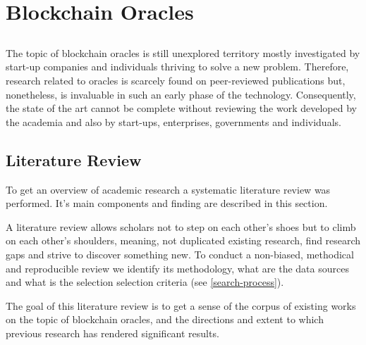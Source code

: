 \chapter{Blockchain Oracles} \label{chap:sota}

\section*{}



The topic of blockchain oracles is still unexplored territory mostly investigated by start-up companies and individuals thriving to solve a new problem. Therefore, research related to oracles is scarcely found on peer-reviewed publications but, nonetheless, is invaluable in such an early phase of the technology. Consequently, the state of the art cannot be complete without reviewing the work developed by the academia and also by start-ups, enterprises, governments and individuals.

\section{Literature Review}

To get an overview of academic research a systematic literature review was performed. It's main components and finding are described in this section.

A literature review allows scholars not to step on each other's shoes but to climb on each other's shoulders, meaning, not duplicated existing research, find research gaps and strive to discover something new. To conduct a non-biased, methodical and reproducible review we identify its methodology, what are the data sources and what is the selection selection criteria (see \ref{search-process}).

The goal of this literature review is to get a sense of the corpus of existing works on the topic of blockchain oracles, and the directions and extent to which previous research has rendered significant results.

